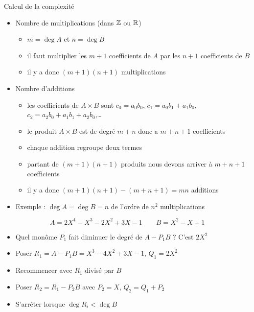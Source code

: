 \begin{frame}
Calcul de la complexité
\bigskip

\pause
\begin{itemize}
  \item Nombre de multiplications (dans $\mathbb{Z}$ ou $\mathbb{R}$)
\pause
  \begin{itemize}
    \item $m = \deg A$ et $n = \deg B$
\pause
    \item il faut multiplier les $m+1$ coefficients de $A$ par les $n+1$ coefficients de $B$
\pause    
    \item il y a donc $(m+1)(n+1)$ multiplications
  \end{itemize}
\pause
  \item Nombre d'additions
\pause
  \begin{itemize}
    \item les coefficients de $A\times B$ sont $c_0 = a_0 b_0$, 
    $c_1 = a_0b_1+a_1b_0$, $c_2=a_2b_0+a_1b_1+a_2b_0$,\ldots
\pause
    \item le produit $A\times B$ est de degré $m+n$ donc a $m+n+1$ coefficients
\pause
    \item chaque addition regroupe deux termes
\pause
    \item partant de $(m+1)(n+1)$ produits nous devons arriver à $m+n+1$ coefficients
\pause
    \item il y a donc $(m+1)(n+1)-(m+n+1) = mn$ additions
  \end{itemize}
\pause
  \item Exemple : $\deg A=\deg B=n$ de l'ordre de $n^2$ multiplications
\end{itemize}
\end{frame}



\begin{frame}

$$A = 2X^4-X^3-2X^2+3X-1 \qquad B=X^2-X+1$$

\pause


\pause
\vspace*{-2ex}

\begin{itemize}
  \item Quel monôme $P_1$ fait diminuer le degré de $A-P_1B$ ? C'est $2X^2$ 
\pause
  \item Poser $R_1=A-P_1B=X^3-4X^2+3X-1$, $Q_1 = 2X^2$
\pause
  \item Recommencer avec $R_1$ divisé par $B$
\pause
  \item Poser $R_2 = R_1-P_2B$ avec $P_2 = X$, $Q_2= Q_1+P_2$
\pause
  \item S'arrêter lorsque $\deg R_i < \deg B$
\end{itemize}

\end{frame}



